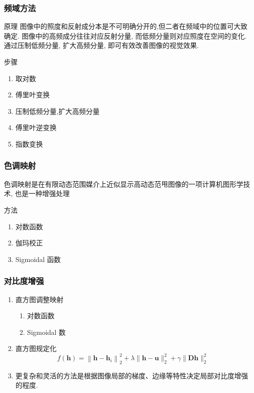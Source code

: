\documentclass{beamer}
\begin{document}
\begin{frame}
  \frametitle{频域方法}
  \begin{block}{原理}
    图像中的照度和反射成分本是不可明确分开的,但二者在频域中的位置可大致确定.
    图像中的高频成分往往对应反射分量, 而低频分量则对应照度在空间的变化.
    通过压制低频分量, 扩大高频分量, 即可有效改善图像的视觉效果.
  \end{block}
  \begin{block}{步骤}
    \begin{enumerate}
    \item 取对数
    \item 傅里叶变换
    \item 压制低频分量,扩大高频分量
    \item 傅里叶逆变换
    \item 指数变换
    \end{enumerate}
  \end{block}
\end{frame}

\begin{frame}
  \frametitle{ 色调映射}
  \begin{block}
色调映射是在有限动态范围媒介上近似显示高动态范甩图像的一项计算机图形学技术, 也是一种增强处理
\end{block}

\begin{block}{方法}
  \begin{enumerate}
  \item 对数函数
  \item 伽玛校正
  \item Sigmoidal 函数
  \end{enumerate}
\end{block}
\end{frame}


\begin{frame}
  \frametitle{对比度增强}

  \begin{block}

    \begin{enumerate}
    \item 直方图调整映射
      \begin{enumerate}
      \item 对数函数
      \item Sigmoidal 数
      \end{enumerate}
    \item 直方图规定化
  \begin{equation}
    \label{eq:13}
    f(\boldsymbol{h})=\left\|\boldsymbol{h}-\boldsymbol{h}_{i}\right\|_{2}^{2}+\lambda\|\boldsymbol{h}-\boldsymbol{u}\|_{2}^{2}+\gamma\|\boldsymbol{D} \boldsymbol{h}\|_{2}^{2}
  \end{equation}
    \item 更复杂和灵活的方法是根据图像局部的梯度、边缘等特性决定局部对比度增强的程度.
    \end{enumerate}

  \end{block}

\end{frame}
\end{document}
